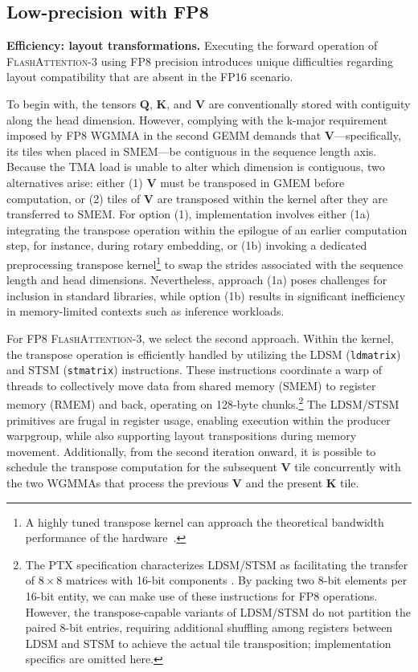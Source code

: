 \subsection{Low-precision with FP8}
\label{sec:algofp8}

\textbf{Efficiency: layout transformations.} Executing the forward operation of \textsc{FlashAttention-3} using FP8 precision introduces unique difficulties regarding layout compatibility that are absent in the FP16 scenario.

To begin with, the tensors $\mathbf{Q}$, $\mathbf{K}$, and $\mathbf{V}$ are conventionally stored with contiguity along the head dimension. However, complying with the k-major requirement imposed by FP8 WGMMA in the second GEMM demands that $\mathbf{V}$—specifically, its tiles when placed in SMEM—be contiguous in the sequence length axis. Because the TMA load is unable to alter which dimension is contiguous, two alternatives arise: either (1) $\mathbf{V}$ must be transposed in GMEM before computation, or (2) tiles of $\mathbf{V}$ are transposed within the kernel after they are transferred to SMEM. For option (1), implementation involves either (1a) integrating the transpose operation within the epilogue of an earlier computation step, for instance, during rotary embedding, or (1b) invoking a dedicated preprocessing transpose kernel\footnote{A highly tuned transpose kernel can approach the theoretical bandwidth performance of the hardware~\citep{colfax_cutlass_transpose_2024}.} to swap the strides associated with the sequence length and head dimensions. Nevertheless, approach (1a) poses challenges for inclusion in standard libraries, while option (1b) results in significant inefficiency in memory-limited contexts such as inference workloads.

For FP8 \textsc{FlashAttention-3}, we select the second approach. Within the kernel, the transpose operation is efficiently handled by utilizing the LDSM (\verb|ldmatrix|) and STSM (\verb|stmatrix|) instructions. These instructions coordinate a warp of threads to collectively move data from shared memory (SMEM) to register memory (RMEM) and back, operating on 128-byte chunks.\footnote{The PTX specification characterizes LDSM/STSM as facilitating the transfer of $8 \times 8$ matrices with 16-bit components \cite[\S 9.7.13.4.15-16]{ptx}. By packing two 8-bit elements per 16-bit entity, we can make use of these instructions for FP8 operations. However, the transpose-capable variants of LDSM/STSM do not partition the paired 8-bit entries, requiring additional shuffling among registers between LDSM and STSM to achieve the actual tile transposition; implementation specifics are omitted here.} The LDSM/STSM primitives are frugal in register usage, enabling execution within the producer warpgroup, while also supporting layout transpositions during memory movement. Additionally, from the second iteration onward, it is possible to schedule the transpose computation for the subsequent $\mathbf{V}$ tile concurrently with the two WGMMAs that process the previous $\mathbf{V}$ and the present $\mathbf{K}$ tile.

